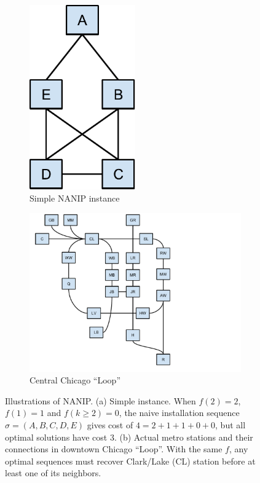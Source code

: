 \documentclass[english]{llncs}
\begin{document}
\begin{figure}[th]
\begin{subfigure}[b]{0.4\textwidth}
\centering
\includegraphics[width=0.5\textwidth]{simple}
\caption{Simple NANIP instance}
\end{subfigure}%
\begin{subfigure}[b]{0.6\textwidth}
\centering
\includegraphics[width=1.0\textwidth]{Chicago_Loop_schematic} 
\caption{Central Chicago ``Loop''}
\end{subfigure}
\caption{Illustrations of NANIP.
(a) Simple instance.  
When $f(2)=2$, $f(1)=1$ and $f(k\geq2)=0$, the naive installation sequence $\sigma=(A,B,C,D,E)$
gives cost of $4=2+1+1+0+0$, but all optimal solutions have cost $3$.\label{fig:illustration}
(b) Actual metro stations and their connections in downtown Chicago ``Loop''.  
With the same $f$, any optimal sequences must recover Clark/Lake (CL) station before at least one of its neighbors.}
\end{figure}
\end{document}
